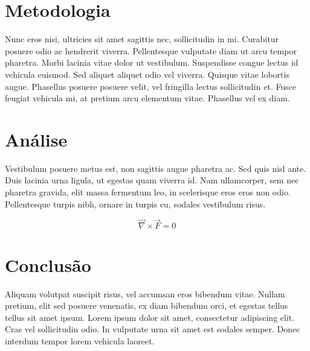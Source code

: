 \documentclass[a4paper, 11pt]{article}
\begin{document}
\begin{multicols}{2}
        \section{Metodologia}
        \noindent Nunc eros nisi, ultricies sit amet sagittis nec, sollicitudin in mi. Curabitur posuere odio ac hendrerit viverra. Pellentesque vulputate diam ut arcu tempor pharetra. Morbi lacinia vitae dolor ut vestibulum. Suspendisse congue lectus id vehicula euismod. Sed aliquet aliquet odio vel viverra. Quisque vitae lobortis augue. Phasellus posuere posuere velit, vel fringilla lectus sollicitudin et. Fusce feugiat vehicula mi, at pretium arcu elementum vitae. Phasellus vel ex diam.
        
        \section{Análise}
        Vestibulum posuere metus est, non sagittis augue pharetra ac. Sed quis nisl ante. Duis lacinia urna ligula, ut egestas quam viverra id. Nam ullamcorper, sem nec pharetra gravida, elit massa fermentum leo, in scelerisque eros eros non odio. Pellentesque turpis nibh, ornare in turpis eu, sodales vestibulum risus.
        
        $$
            \vec{\nabla} \times \vec{F} = 0
        $$
        
        \section{Conclusão}
         Aliquam volutpat suscipit risus, vel accumsan eros bibendum vitae. Nullam pretium, elit sed posuere venenatis, ex diam bibendum orci, et egestas tellus tellus sit amet ipsum. Lorem ipsum dolor sit amet, consectetur adipiscing elit. Cras vel sollicitudin odio. In vulputate urna sit amet est sodales semper. Donec interdum tempor lorem vehicula laoreet.
    \end{multicols}
    
    \nocite{jackson1999classical}
    \nocite{sakurai2021modern}
    
    
    
    
\end{document}
